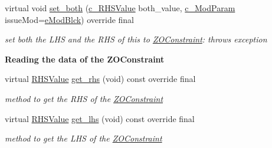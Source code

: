 \begin{Indent}
\begin{DoxyCompactItemize}
virtual void \mbox{\hyperlink{class_s_m_spp__di__unipi__it_1_1_z_o_constraint_aca9b52dad8cd2c7a830d2ebfe0ac31f3}{set\+\_\+both}} (\mbox{\hyperlink{class_s_m_spp__di__unipi__it_1_1_row_constraint_a34abd4b01d3a2024be5f6d13dd88779f}{c\+\_\+\+R\+H\+S\+Value}} both\+\_\+value, \mbox{\hyperlink{group___modification___t_y_p_e_s_ga544246d8c462e9a2d817c2c30797968f}{c\+\_\+\+Mod\+Param}} issue\+Mod=\mbox{\hyperlink{group___modification___t_y_p_e_s_gga48fddcdd03a03f49b7e389ca1ed938d4a21b14b26b1c0093a0905f6fc010bad29}{e\+Mod\+Blck}}) override final
\begin{DoxyCompactList}\small\item\em set both the L\+HS and the R\+HS of this to \mbox{\hyperlink{class_s_m_spp__di__unipi__it_1_1_z_o_constraint}{Z\+O\+Constraint}}\+: throws exception \end{DoxyCompactList}\end{DoxyCompactItemize}
\end{Indent}
\begin{Indent}\textbf{ Reading the data of the Z\+O\+Constraint}\par
\begin{DoxyCompactItemize}
\item 
\mbox{\label{class_s_m_spp__di__unipi__it_1_1_z_o_constraint_a492119664a2167a60aa99a4ad1146b03}} 
virtual \mbox{\hyperlink{class_s_m_spp__di__unipi__it_1_1_row_constraint_a8813536ab3b13a81c8e83a999ade3bd8}{R\+H\+S\+Value}} \mbox{\hyperlink{class_s_m_spp__di__unipi__it_1_1_z_o_constraint_a492119664a2167a60aa99a4ad1146b03}{get\+\_\+rhs}} (void) const override final
\begin{DoxyCompactList}\small\item\em method to get the R\+HS of the \mbox{\hyperlink{class_s_m_spp__di__unipi__it_1_1_z_o_constraint}{Z\+O\+Constraint}} \end{DoxyCompactList}\item 
\mbox{\label{class_s_m_spp__di__unipi__it_1_1_z_o_constraint_ae3f29ca01d997a48a1b842f66f718ca2}} 
virtual \mbox{\hyperlink{class_s_m_spp__di__unipi__it_1_1_row_constraint_a8813536ab3b13a81c8e83a999ade3bd8}{R\+H\+S\+Value}} \mbox{\hyperlink{class_s_m_spp__di__unipi__it_1_1_z_o_constraint_ae3f29ca01d997a48a1b842f66f718ca2}{get\+\_\+lhs}} (void) const override final
\begin{DoxyCompactList}\small\item\em method to get the L\+HS of the \mbox{\hyperlink{class_s_m_spp__di__unipi__it_1_1_z_o_constraint}{Z\+O\+Constraint}} \end{DoxyCompactList}\end{DoxyCompactItemize}
\end{Indent}
